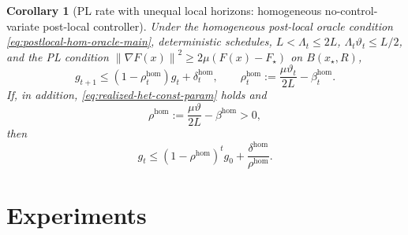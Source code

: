 \documentclass{article}
\newtheorem{corollary}[theorem]{Corollary}
\theoremstyle{definition}
\newcommand{\norm}[1]{\left\lVert #1\right\rVert}
\begin{document}
\begin{corollary}[PL rate with unequal local horizons: homogeneous no-control-variate post-local controller]
\label{cor:realized-hom-PL}
Under the homogeneous post-local oracle condition \eqref{eq:postlocal-hom-oracle-main}, deterministic schedules, $L<\Lambda_t\le 2L$, $\Lambda_t\vartheta_t\le L/2$, and the PL condition $\norm{\nabla F(x)}^2\ge 2\mu(F(x)-F_\star)$ on $B(x_\star,R)$,
\begin{equation}
\textstyle g_{t+1}
\le
(1-\rho_t^{\mathrm{hom}})g_t+\delta_t^{\mathrm{hom}},
\qquad
\rho_t^{\mathrm{hom}}:=\frac{\mu\vartheta_t}{2L}-\beta_t^{\mathrm{hom}}.
\label{eq:realized-hom-PL-rec}\end{equation}
If, in addition, \eqref{eq:realized-het-const-param} holds and
\begin{equation}
\textstyle\rho^{\mathrm{hom}}
:=
\frac{\mu\vartheta}{2L}-\beta^{\mathrm{hom}}>0,
\label{eq:realized-hom-rho}\end{equation}
then
\begin{equation}
g_t
\le
(1-\rho^{\mathrm{hom}})^t g_0+\frac{\delta^{\mathrm{hom}}}{\rho^{\mathrm{hom}}}.
\label{eq:realized-hom-PL-rate}\end{equation}
\end{corollary}

\section{Experiments}
\end{document}
